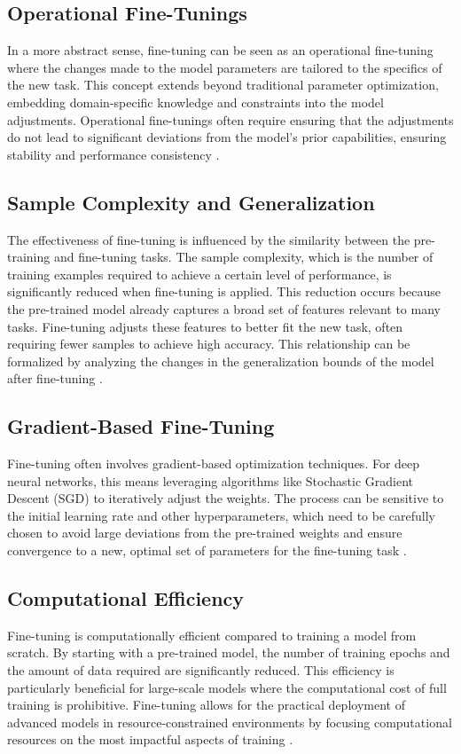 \subsection{Operational Fine-Tunings}
In a more abstract sense, fine-tuning can be seen as an operational fine-tuning where the changes made to the model parameters are tailored to the specifics of the new task. This concept extends beyond traditional parameter optimization, embedding domain-specific knowledge and constraints into the model adjustments. Operational fine-tunings often require ensuring that the adjustments do not lead to significant deviations from the model's prior capabilities, ensuring stability and performance consistency \cite{Catani2020A}.

\subsection{Sample Complexity and Generalization}
The effectiveness of fine-tuning is influenced by the similarity between the pre-training and fine-tuning tasks. The sample complexity, which is the number of training examples required to achieve a certain level of performance, is significantly reduced when fine-tuning is applied. This reduction occurs because the pre-trained model already captures a broad set of features relevant to many tasks. Fine-tuning adjusts these features to better fit the new task, often requiring fewer samples to achieve high accuracy. This relationship can be formalized by analyzing the changes in the generalization bounds of the model after fine-tuning \cite{Shachaf2021A}.

\subsection{Gradient-Based Fine-Tuning}
Fine-tuning often involves gradient-based optimization techniques. For deep neural networks, this means leveraging algorithms like Stochastic Gradient Descent (SGD) to iteratively adjust the weights. The process can be sensitive to the initial learning rate and other hyperparameters, which need to be carefully chosen to avoid large deviations from the pre-trained weights and ensure convergence to a new, optimal set of parameters for the fine-tuning task \cite{Vrbancic2020Transfer}.

\subsection{Computational Efficiency}
Fine-tuning is computationally efficient compared to training a model from scratch. By starting with a pre-trained model, the number of training epochs and the amount of data required are significantly reduced. This efficiency is particularly beneficial for large-scale models where the computational cost of full training is prohibitive. Fine-tuning allows for the practical deployment of advanced models in resource-constrained environments by focusing computational resources on the most impactful aspects of training \cite{Xiao2023Offsite-Tuning:}.

